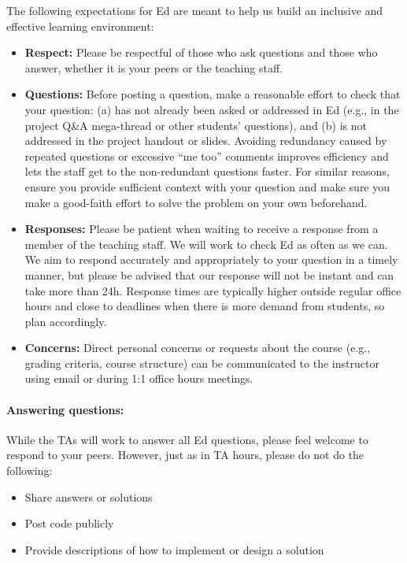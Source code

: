 \documentclass[letterpaper,11pt]{article}
\begin{document}
The following expectations for Ed are meant to help us build an inclusive
and effective learning environment:
\begin{itemize}

\item \textbf{Respect:} Please be respectful of those who ask questions and
those who answer, whether it is your peers or the teaching staff.

\item \textbf{Questions:} Before posting a question, make a reasonable
  effort to check that your question: (a) has not already been asked
  or addressed in Ed (e.g., in the project Q\&A mega-thread or other
  students' questions), and (b) is not addressed in the project
  handout or slides. Avoiding redundancy caused by repeated questions
  or excessive ``me too'' comments improves efficiency and lets the
  staff get to the non-redundant questions faster. For similar
  reasons, ensure you provide sufficient context with your question
  and make sure you make a good-faith effort to solve the problem on
  your own beforehand.

\item \textbf{Responses:} Please be patient when waiting to receive a
  response from a member of the teaching staff. We will work to check
  Ed as often as we can. We aim to respond accurately and
  appropriately to your question in a timely manner, but please be
  advised that our response will not be instant and can take more than
  24h. Response times are typically higher outside regular office
  hours and close to deadlines when there is more demand from
  students, so plan accordingly.

\item \textbf{Concerns:} Direct personal concerns or requests about
  the course (e.g., grading criteria, course structure) can be
  communicated to the instructor using email or during 1:1 office
  hours meetings.

\end{itemize}

\paragraph{Answering questions:}
While the TAs will work to answer all Ed questions, please feel welcome to respond to your
peers. However, just as in TA hours, please do not do the following:

\begin{itemize}
\item Share answers or solutions
\item Post code publicly
\item Provide descriptions of how to implement or design a solution
\end{itemize}
\end{document}
